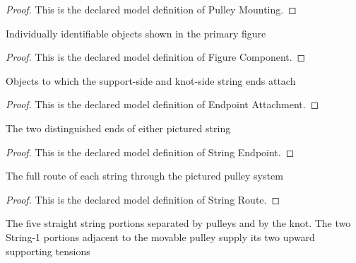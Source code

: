 \begin{proof}
  This is the declared model definition of Pulley Mounting.
\end{proof}
\begin{definition}
  \label{def:physics:phyx-mini-0292:phyxminiproblems-problemphyxmini0292-figurecomponent}
  Individually identifiable objects shown in the primary figure
\end{definition}
\begin{proof}
  This is the declared model definition of Figure Component.
\end{proof}
\begin{definition}
  \label{def:physics:phyx-mini-0292:phyxminiproblems-problemphyxmini0292-endpointattachment}
  Objects to which the support-side and knot-side string ends attach
\end{definition}
\begin{proof}
  This is the declared model definition of Endpoint Attachment.
\end{proof}
\begin{definition}
  \label{def:physics:phyx-mini-0292:phyxminiproblems-problemphyxmini0292-stringendpoint}
  The two distinguished ends of either pictured string
\end{definition}
\begin{proof}
  This is the declared model definition of String Endpoint.
\end{proof}
\begin{definition}
  \label{def:physics:phyx-mini-0292:phyxminiproblems-problemphyxmini0292-stringroute}
  The full route of each string through the pictured pulley system
\end{definition}
\begin{proof}
  This is the declared model definition of String Route.
\end{proof}
\begin{definition}
  \label{def:physics:phyx-mini-0292:phyxminiproblems-problemphyxmini0292-stringsegment}
  The five straight string portions separated by pulleys and by the knot. The two String-1 portions adjacent to the movable pulley supply its two upward supporting tensions
\end{definition}
